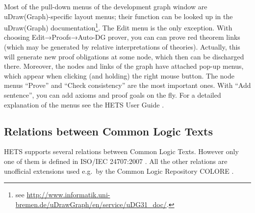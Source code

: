 \documentclass{article}
\newcommand{\normalTEXTSC}[2]{{#1\scriptsize#2}}
\newcommand     {\Hets}{\normalTEXTSC{H}{ETS}\xspace}
\begin{document}
Most of the pull-down menus of the development graph window are
uDraw(Graph)-specific layout menus; their function can be looked up in
the uDraw(Graph) documentation\footnote{see
  \url{http://www.informatik.uni-bremen.de/uDrawGraph/en/service/uDG31\_doc/}.}.
The Edit menu is the only exception. 
With choosing Edit→Proofs→Auto-DG prover, you can can prove red theorem
links (which may be generated by relative interpretations of theories).
Actually, this will generate new proof obligations at some node,
which then can be discharged there.
Moreover, the nodes and links of the
graph have attached pop-up menus, which appear when clicking (and
holding) the right mouse button. 
The node menus ``Prove'' and ``Check consistency'' are the most
important ones. With ``Add sentence'', you can add axioms and
proof goals on the fly.
For a detailed explanation of the menus
see the \Hets User Guide \cite{HetsUserGuide}.

\subsection{Relations between Common Logic Texts}
\label{relationsInCL}
\Hets supports several relations between Common Logic Texts. However only one of
them is defined in ISO/IEC 24707:2007 \cite{CommonLogic:oldfashioned}. All the other relations are 
unofficial extensions used e.g.\ by the Common Logic Repository COLORE \cite{Colore}.
\end{document}
